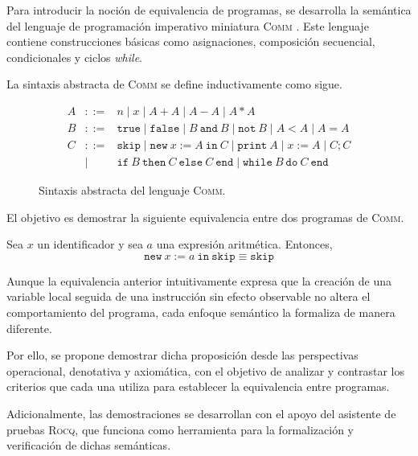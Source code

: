 Para introducir la noción de equivalencia de programas, se desarrolla la semántica del lenguaje de programación imperativo miniatura \textsc{Comm} \cite{bauer}. Este lenguaje contiene construcciones básicas como asignaciones, composición secuencial, condicionales y ciclos \textit{while}.

La sintaxis abstracta de \textsc{Comm} se define inductivamente como sigue. 
\begin{figure}[ht]
\centering
{\footnotesize
\[
\begin{array}{rcl}
A & ::= & n
      \mid x
      \mid A + A
      \mid A - A
      \mid A * A
      \\[1mm]

B & ::= & \mathtt{true}
      \mid \mathtt{false}
      \mid B\ \mathtt{and}\ B
      \mid  \mathtt{not}\ B
      \mid A < A
      \mid A =A
      \\[1mm]

C & ::= & \mathtt{skip}
      \mid \mathtt{new}\ x := A\ \mathtt{in}\ C
      \mid \mathtt{print}\ A
      \mid x := A
      \mid C; C \\ 
    & \mid & \mathtt{if}\ B\ \mathtt{then}\ C\ \mathtt{else}\ C\ \mathtt{end}
      \mid \mathtt{while}\ B\ \mathtt{do}\ C\ \mathtt{end}
\end{array}
\]
}
\caption{Sintaxis abstracta del lenguaje \textsc{Comm}.}
\end{figure}

El objetivo es demostrar la siguiente equivalencia entre dos programas de \textsc{Comm}.

\begin{proposicion}
Sea $x$ un identificador y sea $a$ una expresión aritmética. Entonces,
\[
      \mathtt{new }\ x := a\ \mathtt{in}\ \mathtt{skip} \equiv \mathtt{skip}
\]
\end{proposicion}

Aunque la equivalencia anterior intuitivamente expresa que la creación de una variable local seguida de una instrucción sin efecto observable no altera el comportamiento del programa, cada enfoque semántico la formaliza de manera diferente. 

Por ello, se propone demostrar dicha proposición desde las perspectivas operacional, denotativa y axiomática, con el objetivo de analizar y contrastar los criterios que cada una utiliza para establecer la equivalencia entre programas.

Adicionalmente, las demostraciones se desarrollan con el apoyo del asistente de pruebas \textsc{Rocq}, que funciona como herramienta para la formalización y verificación de dichas semánticas.

